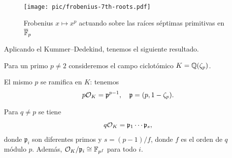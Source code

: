 \begin{figure}
  \begin{center}
    \texttt{[image: pic/frobenius-7th-roots.pdf]}
  \end{center}

  \caption{Frobenius $x \mapsto x^p$ actuando sobre las raíces séptimas primitivas en $\overline{\mathbb{F}}_p$}
  \label{fig:frobenius-sobre-septimas-raices}
\end{figure}

Aplicando el Kummer--Dedekind, tenemos el siguiente resultado.

\begin{proposicion}
  \label{prop:factorizacion-en-Q-zeta-p}
  Para un primo $p \ne 2$ consideremos el campo ciclotómico $K = \mathbb{Q} (\zeta_p)$.

  El mismo $p$ se ramifica en $K$: tenemos
  $$p \mathcal{O}_K = \mathfrak{p}^{p-1}, \quad \mathfrak{p} = (p, 1 - \zeta_p).$$

  Para $q \ne p$ se tiene
  $$q \mathcal{O}_K = \mathfrak{p}_1\cdots \mathfrak{p}_s,$$
  donde $\mathfrak{p}_i$ son diferentes primos y $s = (p-1)/f$,
  donde $f$ es el orden de $q$ módulo $p$.
  Además, $\mathcal{O}_K/\mathfrak{p}_i \cong \mathbb{F}_{p^f}$ para todo $i$.
\end{proposicion}

